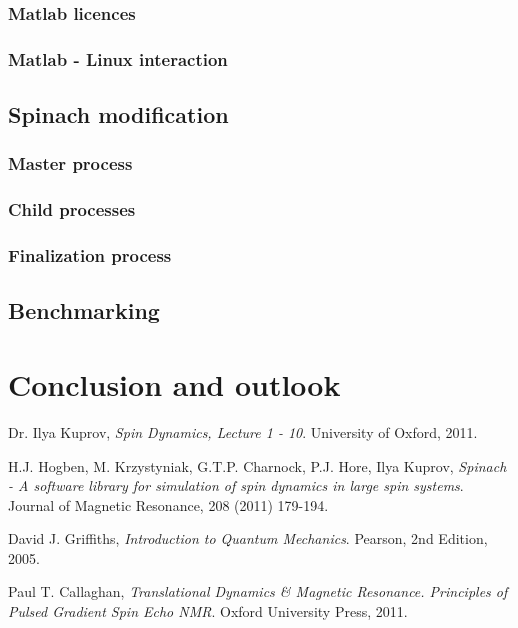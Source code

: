 \documentclass[11.5pt,a4paper]{article}
\begin{document}
\subsubsection{Matlab licences}
\subsubsection{Matlab - Linux interaction}

\subsection{Spinach modification}
\subsubsection{Master process}
\subsubsection{Child processes}
\subsubsection{Finalization process}

\subsection{Benchmarking}

\section{Conclusion and outlook}

\FloatBarrier
\begin{thebibliography}{9}
  Dr. Ilya Kuprov,
  \emph{Spin Dynamics, Lecture 1 - 10}.
  University of Oxford,
  2011.

  H.J. Hogben, M. Krzystyniak, G.T.P. Charnock, P.J. Hore, Ilya Kuprov,
  \emph{Spinach - A software library for simulation of spin dynamics in large spin systems}.
  Journal of Magnetic Resonance,
  208 (2011) 179-194.

  David J. Griffiths,
  \emph{Introduction to Quantum Mechanics}.
  Pearson, 
  2nd Edition, 
  2005.

  Paul T. Callaghan,
  \emph{Translational Dynamics \& Magnetic Resonance. Principles of Pulsed Gradient Spin Echo NMR}.
  Oxford University Press,
  2011.

\end{thebibliography}
\end{document}
